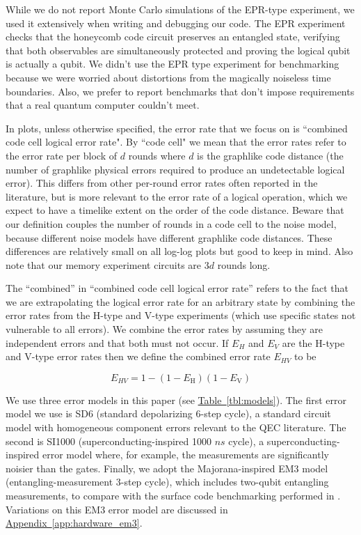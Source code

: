 \documentclass[onecolumn,a4paper,accepted=2022-09-12]{quantumarticle}
\theoremstyle{definition}
\theoremstyle{definition}
\theoremstyle{definition}
\DeclareRobustCommand{\app}[1]{\hyperref[app:#1]{Appendix~\ref*{app:#1}}}
\newcommand{\tbl}[1]{\hyperref[tbl:#1]{Table~\ref*{tbl:#1}}}
\begin{document}
While we do not report Monte Carlo simulations of the EPR-type experiment, we used it extensively when writing and debugging our code.
The EPR experiment checks that the honeycomb code circuit preserves an entangled state, verifying that both observables are simultaneously protected and proving the logical qubit is actually a qubit.
We didn't use the EPR type experiment for benchmarking because we were worried about distortions from the magically noiseless time boundaries.
Also, we prefer to report benchmarks that don't impose requirements that a real quantum computer couldn't meet.

In plots, unless otherwise specified, the error rate that we focus on is ``combined code cell logical error rate".
By ``code cell" we mean that the error rates refer to the error rate per block of $d$ rounds where $d$ is the graphlike code distance (the number of graphlike physical errors required to produce an undetectable logical error).
This differs from other per-round error rates often reported in the literature, but is more relevant to the error rate of a logical operation, which we expect to have a timelike extent on the order of the code distance.  
Beware that our definition couples the number of rounds in a code cell to the noise model, because different noise models have different graphlike code distances.
These differences are relatively small on all log-log plots but good to keep in mind.
Also note that our memory experiment circuits are $3d$ rounds long.

The ``combined'' in ``combined code cell logical error rate'' refers to the fact that we are extrapolating the logical error rate for an arbitrary state by combining the error rates from the H-type and V-type experiments (which use specific states not vulnerable to all errors).
We combine the error rates by assuming they are independent errors and that both must not occur.
If $E_H$ and $E_V$ are the H-type and V-type error rates then we define the combined error rate $E_{HV}$ to be

\begin{equation}
    E_{HV} = 1 - (1 - E_{\text{H}}) (1 -  E_{\text{V}})
    \label{eq:combined_logical_error}
\end{equation}

We use three error models in this paper (see \tbl{models}).
The first error model we use is SD6 (standard depolarizing 6-step cycle), a standard circuit model with homogeneous component errors relevant to the QEC literature.
The second is SI1000 (superconducting-inspired 1000 $ns$ cycle), a superconducting-inspired error model where, for example, the measurements are significantly noisier than the gates.  
Finally, we adopt the Majorana-inspired EM3 model (entangling-measurement 3-step cycle), which includes two-qubit entangling measurements, to compare with the surface code benchmarking performed in \cite{chao2020optimization}. Variations on this EM3 error model are discussed in \app{hardware_em3}.
\end{document}
